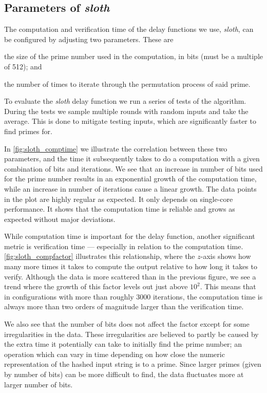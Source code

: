 \subsection{Parameters of \textit{sloth}}%
\label{sub:sloth_parameters}

The computation and verification time of the delay functions we use, \textit{sloth}, can be configured by adjusting two parameters.
These are
\begin{eletterate*}
\item the size of the prime number used in the computation, in bits (must be a multiple of 512); and
\item the number of times to iterate through the permutation process of said prime.
\end{eletterate*}

To evaluate the \textit{sloth} delay function we run a series of tests of the algorithm.
During the tests we sample multiple rounds with random inputs and take the average.
This is done to mitigate testing inputs, which are significantly faster to find primes for.

In \vref{fig:sloth_comptime} we illustrate the correlation between these two parameters, and the time it subsequently takes to do a computation with a given combination of bits and iterations.
We see that an increase in number of bits used for the prime number results in an exponential growth of the computation time, while an increase in number of iterations cause a linear growth.
The data points in the plot are highly regular as expected. It only depends on single-core performance. It shows that the computation time is reliable and grows as expected without major deviations.

While computation time is important for the delay function, another significant metric is verification time --- especially in relation to the computation time.
\vref{fig:sloth_compfactor} illustrates this relationship, where the $z$-axis shows how many more times it takes to compute the output relative to how long it takes to verify.
Although the data is more scattered than in the previous figure, we see a trend where the growth of this factor levels out just above $10^2$.
This means that in configurations with more than roughly 3000 iterations, the computation time is always more than two orders of magnitude larger than the verification time.

We also see that the number of bits does not affect the factor except for some irregularities in the data.
These irregularities are believed to partly be caused by the extra time it potentially can take to initially find the prime number; an operation which can vary in time depending on how close the numeric representation of the hashed input string is to a prime.
Since larger primes (given by number of bits) can be more difficult to find, the data fluctuates more at larger number of bits.


